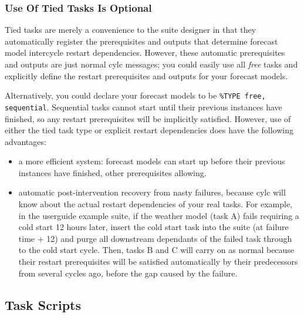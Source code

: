 \documentclass[11pt,a4paper]{article}
\begin{document}
\subsubsection{Use Of Tied Tasks Is Optional}

Tied tasks are merely a convenience to the suite designer in that they
automatically register the prerequisites and outputs that determine
forecast model intercycle restart dependencies. However, these automatic
prerequisites and outputs are just normal cylc messages; you could
easily use all {\em free} tasks and explicitly define the restart
prerequisites and outputs for your forecast models.

Alternatively, you could declare your forecast models to be
\lstinline=%TYPE free, sequential=.  Sequential tasks cannot start until
their previous instances have finished, so any restart prerequisites
will be implicitly satisfied. However, use of either the tied task type
or explicit restart dependencies does have the following advantages:

\begin{itemize}

    \item a more efficient system: forecast models can start up before
        their previous instances have finished, other prerequisites
        allowing.  
    
    \item automatic post-intervention recovery from nasty 
        failures, because cylc will know about the actual restart
        dependencies of your real tasks. For example, in the userguide
        example suite, if the weather model (task A) fails requiring a
        cold start 12 hours later, insert the cold start task into the
        suite (at failure time + 12) and purge all downstream dependants of 
        the failed task through to the cold start cycle. Then, tasks
        B and C will carry on as normal because their restart
        prerequisites will be satisfied automatically by their
        predecessors from several cycles ago, before the gap caused by
        the failure.

\end{itemize}

\subsection{Task Scripts}
\label{TaskScripts}
\end{document}
